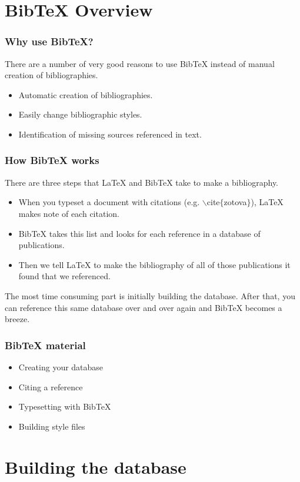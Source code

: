 

\section[BibTeX Overview]{BibTeX Overview}

\begin{frame}  \frametitle{Why use BibTeX?}
	There are a number of very good reasons to use BibTeX instead of manual creation of bibliographies.
	\begin{itemize}
		\item Automatic creation of bibliographies.
		\item Easily change bibliographic styles.
		\item Identification of missing sources referenced in text.
	\end{itemize}
\end{frame}

\begin{frame}  \frametitle{How BibTeX works}
	There are three steps that LaTeX and BibTeX take to make a bibliography.
	\begin{itemize}
		\item When you typeset a document with citations (e.g. {\color{command}$\backslash$cite{\color{braces}$\{$}{\color{black}zotova}{\color{braces}$\}$}}), LaTeX makes note of each citation.
		\item BibTeX takes this list and looks for each reference in a database of publications.
		\item Then we tell LaTeX to make the bibliography of all of those publications it found that we referenced.
	\end{itemize}
	The most time consuming part is initially building the database. After that, you can reference this same database over and over again and BibTeX becomes a breeze.
\end{frame}

\begin{frame}  \frametitle{BibTeX material}
	\begin{itemize}
		\item Creating your database
		\item Citing a reference
		\item Typesetting with BibTeX
		\item Building style files
	\end{itemize}
\end{frame}

\section[Building the database]{Building the database}

